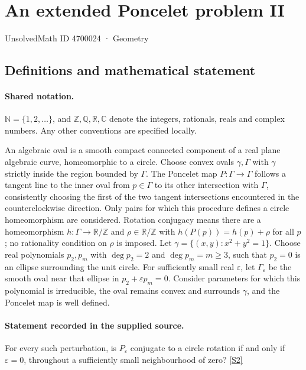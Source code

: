 \documentclass[11pt]{article}
\newcommand{\sref}[2]{\hyperlink{source:#1:#2}{[S#2]}}
\begin{document}
\setcounter{section}{4700023}
\section{An extended Poncelet problem II}\label{4700024}
{\small\sffamily UnsolvedMath ID 4700024 · Geometry}
\subsection{Definitions and mathematical statement}

\paragraph{Shared notation.}$\mathbb N=\{1,2,\ldots\}$, and $\mathbb Z,\mathbb Q,\mathbb R,\mathbb C$ denote the integers, rationals, reals and complex numbers. Any other conventions are specified locally.


An algebraic oval is a smooth compact connected component of a real plane algebraic curve, homeomorphic to a circle. Choose convex ovals $\gamma,\Gamma$ with $\gamma$ strictly inside the region bounded by $\Gamma$. The Poncelet map $P:\Gamma\to\Gamma$ follows a tangent line to the inner oval from $p\in\Gamma$ to its other intersection with $\Gamma$, consistently choosing the first of the two tangent intersections encountered in the counterclockwise direction. Only pairs for which this procedure defines a circle homeomorphism are considered. Rotation conjugacy means there are a homeomorphism $h:\Gamma\to\mathbb R/\mathbb Z$ and $\rho\in\mathbb R/\mathbb Z$ with $h(P(p))=h(p)+\rho$ for all $p$; no rationality condition on $\rho$ is imposed. Let $\gamma=\{(x,y):x^2+y^2=1\}$. Choose real polynomials $p_2,p_m$ with $\deg p_2=2$ and $\deg p_m=m\ge3$, such that $p_2=0$ is an ellipse surrounding the unit circle. For sufficiently small real $\varepsilon$, let $\Gamma_\varepsilon$ be the smooth oval near that ellipse in $p_2+\varepsilon p_m=0$. Consider parameters for which this polynomial is irreducible, the oval remains convex and surrounds $\gamma$, and the Poncelet map is well defined.
\paragraph{Statement recorded in the supplied source.}
For every such perturbation, is $P_\varepsilon$ conjugate to a circle rotation if and only if $\varepsilon=0$, throughout a sufficiently small neighbourhood of zero? \sref{4700024}{2}
\end{document}

